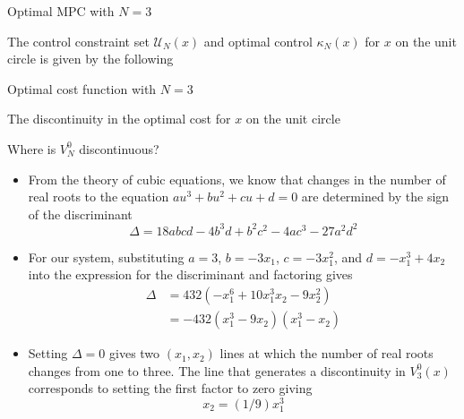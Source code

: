 \documentclass{beamer}
\begin{document}
\begin{frame}{Optimal MPC with $N=3$}

The control constraint set $\mathcal{U}_N(x)$  and optimal
control $\kappa_N(x)$ for $x$ on the unit
circle is given by the following \citep[p. 105]{rawlings:mayne:2009} 

\centerline{\resizebox{0.8\textwidth}{!}{}}

\end{frame}


\begin{frame}{Optimal cost function with $N=3$}

The discontinuity in the optimal cost for $x$ on  the unit circle

\centerline{\resizebox{0.8\textwidth}{!}{}}

\end{frame}

\begin{frame}{Where is $V_N^0$ discontinuous?}

\begin{itemize}
\item From the theory of cubic equations, we know that changes in the number
of real roots to the equation $au^3+bu^2+cu+d=0$ are determined by the
sign of the discriminant 
\begin{equation*}
\Delta = 18 abcd - 4b^3d + b^2c^2 -4ac^3 -27 a^2 d^2
\end{equation*}

\item For our system, substituting $a=3$, $b=-3x_1$, $c=-3x_1^2$, and
$d=-x_1^3+4x_2$ into the expression for the discriminant and factoring
gives 
\begin{align*}
\Delta &= 432 (-x_1^6 + 10 x_1^3x_2 - 9 x_2^2)\\
       &= -432 (x_1^3 - 9 x_2)(x_1^3 -x_2)
\end{align*}

\item Setting $\Delta=0$ gives two $(x_1, x_2)$ lines at which the number
of real roots changes from one to three. The line that generates a discontinuity in
$V_3^0(x)$ corresponds to setting the first factor to zero giving
\begin{equation*}
x_2 = (1/9) x_1^3
\end{equation*}
\end{itemize}
\end{frame}
\end{document}
